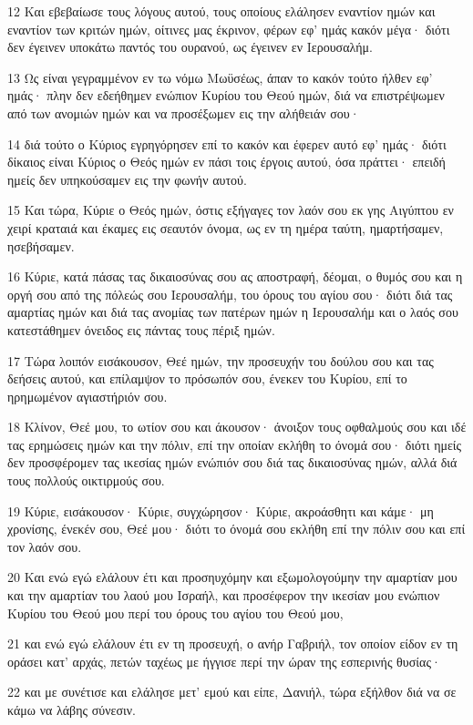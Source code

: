 \par 12 Και εβεβαίωσε τους λόγους αυτού, τους οποίους ελάλησεν εναντίον ημών και εναντίον των κριτών ημών, οίτινες μας έκρινον, φέρων εφ' ημάς κακόν μέγα· διότι δεν έγεινεν υποκάτω παντός του ουρανού, ως έγεινεν εν Ιερουσαλήμ.
\par 13 Ως είναι γεγραμμένον εν τω νόμω Μωϋσέως, άπαν το κακόν τούτο ήλθεν εφ' ημάς· πλην δεν εδεήθημεν ενώπιον Κυρίου του Θεού ημών, διά να επιστρέψωμεν από των ανομιών ημών και να προσέξωμεν εις την αλήθειάν σου·
\par 14 διά τούτο ο Κύριος εγρηγόρησεν επί το κακόν και έφερεν αυτό εφ' ημάς· διότι δίκαιος είναι Κύριος ο Θεός ημών εν πάσι τοις έργοις αυτού, όσα πράττει· επειδή ημείς δεν υπηκούσαμεν εις την φωνήν αυτού.
\par 15 Και τώρα, Κύριε ο Θεός ημών, όστις εξήγαγες τον λαόν σου εκ γης Αιγύπτου εν χειρί κραταιά και έκαμες εις σεαυτόν όνομα, ως εν τη ημέρα ταύτη, ημαρτήσαμεν, ησεβήσαμεν.
\par 16 Κύριε, κατά πάσας τας δικαιοσύνας σου ας αποστραφή, δέομαι, ο θυμός σου και η οργή σου από της πόλεώς σου Ιερουσαλήμ, του όρους του αγίου σου· διότι διά τας αμαρτίας ημών και διά τας ανομίας των πατέρων ημών η Ιερουσαλήμ και ο λαός σου κατεστάθημεν όνειδος εις πάντας τους πέριξ ημών.
\par 17 Τώρα λοιπόν εισάκουσον, Θεέ ημών, την προσευχήν του δούλου σου και τας δεήσεις αυτού, και επίλαμψον το πρόσωπόν σου, ένεκεν του Κυρίου, επί το ηρημωμένον αγιαστήριόν σου.
\par 18 Κλίνον, Θεέ μου, το ωτίον σου και άκουσον· άνοιξον τους οφθαλμούς σου και ιδέ τας ερημώσεις ημών και την πόλιν, επί την οποίαν εκλήθη το όνομά σου· διότι ημείς δεν προσφέρομεν τας ικεσίας ημών ενώπιόν σου διά τας δικαιοσύνας ημών, αλλά διά τους πολλούς οικτιρμούς σου.
\par 19 Κύριε, εισάκουσον· Κύριε, συγχώρησον· Κύριε, ακροάσθητι και κάμε· μη χρονίσης, ένεκέν σου, Θεέ μου· διότι το όνομά σου εκλήθη επί την πόλιν σου και επί τον λαόν σου.
\par 20 Και ενώ εγώ ελάλουν έτι και προσηυχόμην και εξωμολογούμην την αμαρτίαν μου και την αμαρτίαν του λαού μου Ισραήλ, και προσέφερον την ικεσίαν μου ενώπιον Κυρίου του Θεού μου περί του όρους του αγίου του Θεού μου,
\par 21 και ενώ εγώ ελάλουν έτι εν τη προσευχή, ο ανήρ Γαβριήλ, τον οποίον είδον εν τη οράσει κατ' αρχάς, πετών ταχέως με ήγγισε περί την ώραν της εσπερινής θυσίας·
\par 22 και με συνέτισε και ελάλησε μετ' εμού και είπε, Δανιήλ, τώρα εξήλθον διά να σε κάμω να λάβης σύνεσιν.
